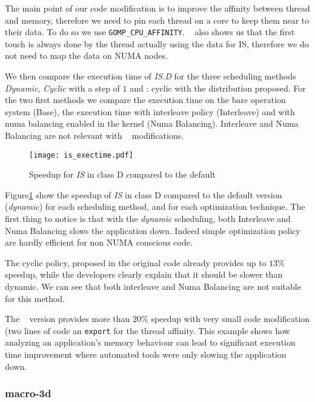 The main point of our code modification is to improve the affinity between
thread and memory, therefore we need to pin each thread on a core to keep them
near to their data. To do so we use \texttt{GOMP\_CPU\_AFFINITY}. \TABARNAC~
also shows us that the first touch is always done by the thread actually using
the data for IS, therefore we do not need to map the data on NUMA nodes.

We then compare the execution time of \emph{IS.D} for the three scheduling
methods \emph{Dynamic}, \emph{Cyclic} with a step of $1$ and \TABARNAC:
cyclic with the distribution proposed. For the two first methods we compare the
execution time on the bare operation system  (Base), the execution time with
interleave policy (Interleave) and with numa balancing enabled in the kernel
(Numa Balancing). Interleave and Numa Balancing are not relevant with
\TABARNAC~ modifications.

\begin{figure}[htpb]
    \centering
    \texttt{[image: is\_exectime.pdf]}
    \caption{Speedup for \emph{IS} in class D compared to the default}
\label{fig:is-res}
\end{figure}

Figure\ref{fig:is-res} show the speedup of \emph{IS} in class D compared to
the default version (\emph{dynamic}) for each scheduling method, and for each
optimization technique. The first thing to notice is that with the
\emph{dynamic} scheduling, both Interleave and Numa Balancing slows
the application down. Indeed simple optimization policy are hardly efficient
for non NUMA conscious code.

The cyclic policy, proposed in the original code already provides up to $13\%$
speedup, while the developers clearly explain that it should be slower than
dynamic. We can see that both interleave and Numa Balancing are not suitable 
for this method.

The \TABARNAC~ version provides more than $20\%$ speedup with very small code
modification (two lines of code an \texttt{export} for the thread affinity.
This example shows how analyzing an application's memory behaviour can lead to
significant execution time improvement where automated tools were only slowing
the application down.

\subsubsection{macro-3d}
\label{sec:exp-macro3d}


